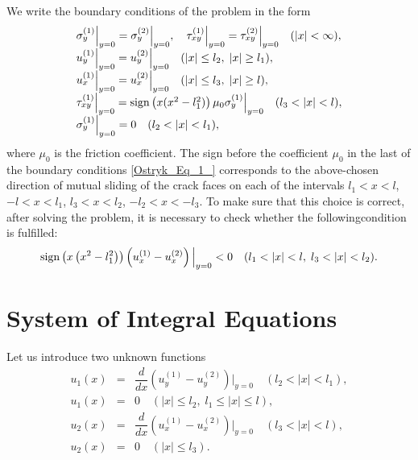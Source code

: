 We write the boundary conditions of the problem in the form
\begin{equation} \label{Ostryk_Eq_1_} 
\begin{array}{l}
	\sigma_{y}^{(1)} \Big|_{y=0} = \sigma_{y}^{(2)} \Big|_{y=0} ,\quad    
	\tau _{xy}^{(1)} \Big|_{y=0} = \tau _{xy}^{(2)} \Big|_{y=0}   \quad (\left|x\right|<\infty ),
	\\
	u_{y}^{(1)} \Big|_{y=0} = u_{y}^{(2)} \Big|_{y=0} \quad (\left|x\right|\le l_{2} ,\; \left|x\right|\ge l_{1} ),  
	\\
	u_{x}^{(1)} \Big|_{y=0} = u_{x}^{(2)} \Big|_{y=0} \quad (\left|x\right|\le l_{3} ,\; \left|x\right|\ge l),  
	\\
	\tau _{xy}^{(1)} \Big|_{y=0} = \operatorname{sign}\left(x(x^{2} -l_{1}^{2} )\right)\mu _{0}  \sigma _{y}^{(1)} \Big|_{y=0}  \quad (l_{3} <\left|x\right|<l),  
	\\ 
	\sigma _{y}^{(1)} \Big|_{y=0} =0  \quad (l_{2} <\left|x\right|<l_{1} ),
\end{array}
\end{equation}  
where $\mu _{0} $ is the friction coefficient. The sign before the coefficient $\mu _{0} $ in the last of the boundary conditions \eqref{Ostryk_Eq_1_} corresponds to the above-chosen direction of mutual sliding of the crack faces on each of the intervals $l_{1} <x<l$, $-l<x<l_{1} $, $l_{3} <x<l_{2} $, $-l_{2} <x<-l_{3} $. To make sure that this choice is correct, after solving the problem, it is necessary to check whether the followingcondition is fulfilled:
\begin{equation} \label{Ostryk_Eq_2_} 
\operatorname{sign}\left(x\left(x^{2} -l_{1}^{2} \right)\right) \left(u_{x}^{(1)} -u_{x}^{(2)} \right)\Big|_{y=0} <0 \quad (l_{1} <\left|x\right|<l,\;  l_{3} <\left|x\right|<l_{2} ).  
\end{equation} 

\section{System of Integral Equations}

Let us introduce two unknown functions
\begin{equation} \label{Ostryk_Eq_3_} 
\begin{array}{rcl}
	u_{1}(x)&=&\dfrac{d}{dx} \left(u_{y}^{(1)} -u_{y}^{(2)} \right)\Big|_{y=0}\quad   (l_{2} <\left|x\right|<l_{1} ),
	\\
	u_{1}(x)&=&0 \quad (\left|x\right|\le l_{2} ,\;  l_{1} \le \left|x\right|\le l),
	\\
	u_{2}(x)&=&\dfrac{d}{dx} \left(u_{x}^{(1)} -u_{x}^{(2)}\right)\Big|_{y=0}  \quad (l_{3} <\left|x\right|<l),\\
	u_{2}(x)&=&0 \quad  (\left|x\right|\le l_{3} ).  
\end{array}
\end{equation} 

